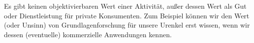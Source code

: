 Es gibt keinen objektivierbaren Wert einer Aktivität, außer dessen Wert als Gut oder Dienstleistung für private Konsumenten.
Zum Beispiel können wir den Wert (oder Unsinn) von Grundlagenforschung für unsere Urenkel erst wissen, wenn wir dessen (eventuelle) kommerzielle Anwendungen kennen.